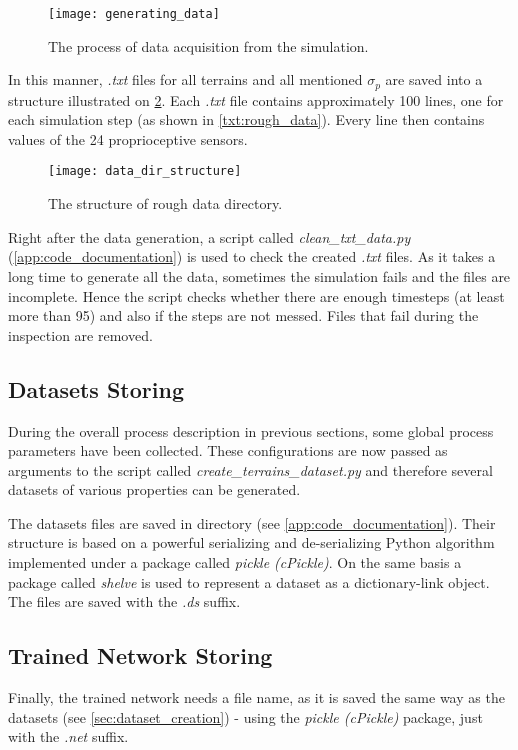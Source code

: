 \begin{figure}[H]
  \centering
  \texttt{[image: generating\_data]}
  \caption{The process of data acquisition from the simulation.}
  \label{img:generating_data}
\end{figure}

In this manner, \textit{.txt} files for all terrains and all mentioned $ \sigma_p $ are saved into a structure illustrated on \cref{img:data_dir_structure}. Each \textit{.txt} file contains approximately 100 lines, one for each simulation step (as shown in \cref{txt:rough_data}). Every line then contains values of the 24 proprioceptive sensors.

\begin{figure}[H]
  \centering
  \texttt{[image: data\_dir\_structure]}
  \caption{The structure of rough data directory.}
  \label{img:data_dir_structure}
\end{figure}

Right after the data generation, a script called \textit{clean\_txt\_data.py} (\ref{app:code_documentation}) is used to check the created \textit{.txt} files. As it takes a long time to generate all the data, sometimes the simulation fails and the files are incomplete. Hence the script checks whether there are enough timesteps (at least more than 95) and also if the steps are not messed. Files that fail during the inspection are removed.

\subsection*{Datasets Storing} \label{ssec:app:datasets_storing}
During the overall process description in previous sections, some global process parameters have been collected. These configurations are now passed as arguments to the script called \textit{create\_terrains\_dataset.py} and therefore several datasets of various properties can be generated.

The datasets files are saved in directory  (see \ref{app:code_documentation}). Their structure is based on a powerful serializing and de-serializing Python algorithm implemented under a package called \textit{pickle (cPickle)}. On the same basis a package called \textit{shelve} is used to represent a dataset as a dictionary-link object. The files are saved with the \textit{.ds} suffix.

\subsection*{Trained Network Storing} \label{ssec:app:network_storing}
Finally, the trained network needs a file name, as it is saved the same way as the datasets (see \cref{sec:dataset_creation}) - using the \textit{pickle (cPickle)} package, just with the \textit{.net} suffix.

